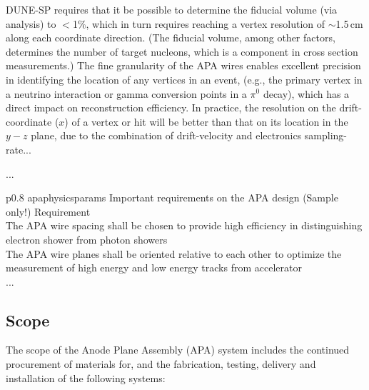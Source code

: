 DUNE-SP requires that it be possible to determine the fiducial volume (via analysis) to $<$1$\%$, which in turn requires reaching a vertex resolution of $\sim$1.5\,cm along each coordinate direction. (The fiducial volume, among other factors, determines the number of target nucleons, which is a component in cross section measurements.) 
The fine granularity of the APA wires enables excellent precision in identifying the location of any vertices in an event, (e.g., the primary vertex in a neutrino interaction or gamma conversion points in a $\pi^{0}$ decay), which has a direct impact on reconstruction efficiency.
In practice, the resolution on the drift-coordinate ($x$) of a vertex or hit will be better than that on its location in the $y-z$ plane, due to the combination of drift-velocity and electronics sampling-rate...

...


\begin{dunetable}
{p{0.8\textwidth}}
{apaphysicsparams}
{Important requirements on the APA design (Sample only!)}   
Requirement  \\ \toprowrule
 The APA wire spacing shall be chosen to provide high efficiency in distinguishing electron shower from photon showers \\ \colhline
 The APA wire planes shall be oriented relative to each other to optimize the measurement of high energy and low energy tracks from accelerator  \\ \colhline
 ...\\ 
\end{dunetable}



\subsection{Scope}
\label{sec:fdsp-apa-scope}

The scope of the Anode Plane Assembly (APA) system includes the continued procurement of materials for, and the fabrication, testing, delivery and installation of the following systems: 

